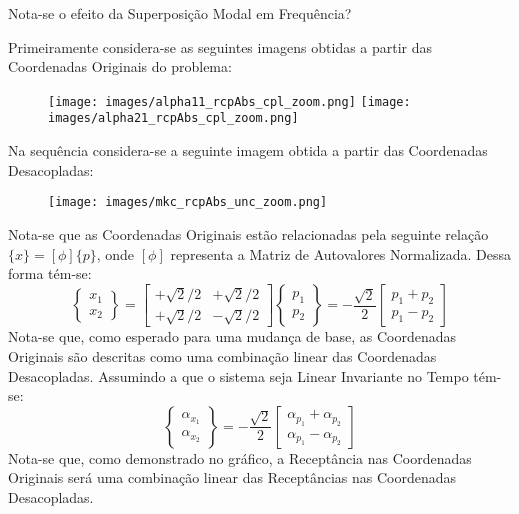 \documentclass{article}
\begin{document}
\newpage\begin{exercise}\label{ex8}
    Nota-se o efeito da Superposição Modal em Frequência?
\end{exercise}
\begin{resolution}
    Primeiramente considera-se as seguintes imagens obtidas a partir das Coordenadas Originais do problema:
    \begin{figure}[H]
        \centering
        \texttt{[image: images/alpha11\_rcpAbs\_cpl\_zoom.png]}
        \texttt{[image: images/alpha21\_rcpAbs\_cpl\_zoom.png]}
    \end{figure}
    Na sequência considera-se a seguinte imagem obtida a partir das Coordenadas Desacopladas:
    \begin{figure}[H]
        \centering
        \texttt{[image: images/mkc\_rcpAbs\_unc\_zoom.png]}
    \end{figure}
    Nota-se que as Coordenadas Originais estão relacionadas pela seguinte relação $\{x\} = [\phi] \{p\}$, onde $[\phi]$ representa a Matriz de Autovalores Normalizada. Dessa forma tém-se:
    \begin{equation*}
        \begin{Bmatrix} x_1 \\ x_2\end{Bmatrix} = 
        \begin{bmatrix} +\sqrt{2}/2 & +\sqrt{2}/2\\ +\sqrt{2}/2 & -\sqrt{2}/2\end{bmatrix} \begin{Bmatrix} p_1\\ p_2\end{Bmatrix} = 
        -\frac{\sqrt{2}}{2} \begin{bmatrix} p_1 + p_2\\ p_1 - p_2\end{bmatrix}
    \end{equation*}
    Nota-se que, como esperado para uma mudança de base, as Coordenadas Originais são descritas como uma combinação linear das Coordenadas Desacopladas. Assumindo a que o sistema seja Linear Invariante no Tempo tém-se:
    \begin{equation*}
        \begin{Bmatrix} \alpha_{x_1} \\ \alpha_{x_2}\end{Bmatrix} = 
        -\frac{\sqrt{2}}{2} \begin{bmatrix} \alpha_{p_1} + \alpha_{p_2}\\ \alpha_{p_1} - \alpha_{p_2}\end{bmatrix}
    \end{equation*}
    Nota-se que, como demonstrado no gráfico, a Receptância nas Coordenadas Originais será uma combinação linear das Receptâncias nas Coordenadas Desacopladas.
\end{resolution}
\end{document}
